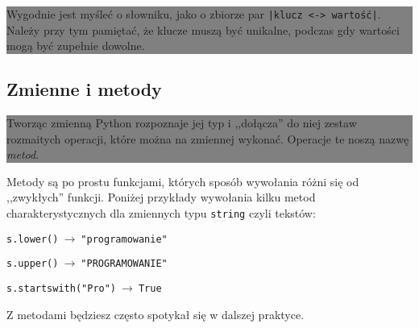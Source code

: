 \documentclass[a4paper]{article}
\newcommand{\important}[1]{
    \begin{center}\colorbox{gray}{
        \begin{minipage}[t]{0.9\textwidth}{#1}
        \end{minipage}
    }
    \end{center}
}
\begin{document}
\important{Wygodnie jest myśleć o słowniku, jako o zbiorze par \texttt{|klucz <-> wartość|}. Należy przy tym pamiętać, że klucze muszą być unikalne, podczas gdy wartości mogą być zupełnie dowolne.}


\subsection*{Zmienne i metody}

\important{
  Tworząc zmienną Python rozpoznaje jej typ i ,,dołącza'' do niej zestaw rozmaitych operacji, które można na zmiennej wykonać. Operacje te noszą nazwę \emph{metod}.}

Metody są po prostu funkcjami, których sposób wywołania różni się od ,,zwykłych'' funkcji. Poniżej przykłady wywołania kilku metod charakterystycznych dla zmiennych typu \texttt{string} czyli tekstów:

\lstinline|s.lower()|$\ \to\ $\texttt{"programowanie"}

\lstinline|s.upper()|$\ \to\ $\texttt{"PROGRAMOWANIE"}

\lstinline|s.startswith("Pro")|$\ \to\ $\texttt{True}

Z metodami będziesz często spotykał się w dalszej praktyce.


\end{document}
